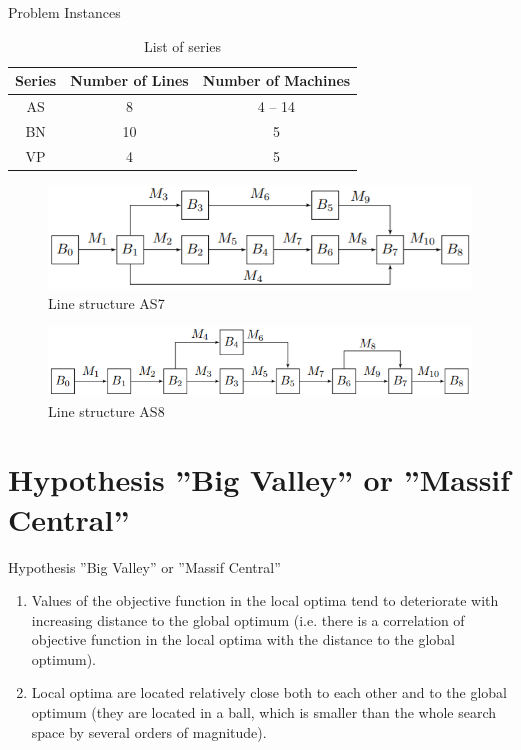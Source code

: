 \documentclass[aspectratio=169,xcolor=dvipsnames]{beamer}
\begin{document}

\begin{frame}{Problem Instances}
\begin{table}[!ht]
\centering
\small
\begin{tabular}{|c|c|c|}
\hline
 \textbf{Series}& \textbf{Number of Lines}& \textbf{Number of Machines}\\
\hline
AS & 8 & 4 -- 14 \\
BN & 10 & 5 \\
VP & 4 & 5 \\
\hline
\end{tabular}
\caption{List of series}\label{tabl:series}
\end{table}
\vspace{-0.2cm}	
 \begin{figure}[h!]
	\centering
	\includegraphics[scale=0.6]{ans7}
\vspace{-0.3cm}	
  \caption{Line structure AS7} \label{fig:vis_as7}
  \end{figure}
\vspace{-0.2cm}	
 \begin{figure}[h!]
	\centering
	\includegraphics[scale=0.55]{ans8}
	\vspace{-0.3cm}
  \caption{Line structure AS8} \label{fig:vis_as8}
  \end{figure}
\end{frame}

\section{Hypothesis ''Big Valley'' or ''Massif Central''}

\begin{frame}{Hypothesis ''Big Valley'' or ''Massif Central''}
\begin{enumerate}
\item Values of the objective function in the local optima tend to deteriorate with increasing distance to the global optimum (i.e. there is a correlation 
of objective function in the local optima with the distance to the global optimum).
\vspace{0.5cm}	
\item Local optima are located relatively close both to each other and to the global optimum (they are located in a ball, which is smaller than 
the whole search space by several orders of magnitude).
\end{enumerate}
\end{frame}
\end{document}
